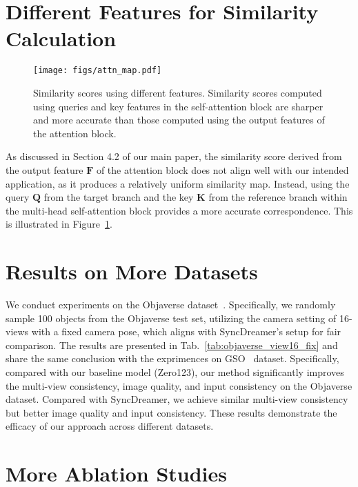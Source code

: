 \section{Different Features for Similarity Calculation}
\begin{figure}[t]
    \centering
    \texttt{[image: figs/attn\_map.pdf]}
    \caption{Similarity scores using different features. Similarity scores computed using queries and key features in the self-attention block are sharper and more accurate than those computed using the output features of the attention block.}
    \label{fig:attn_map}
\end{figure}

As discussed in Section 4.2 of our main paper, the similarity score derived from the output feature $\boldsymbol{F}$ of the attention block does not align well with our intended application, as it produces a relatively uniform similarity map. Instead, using the query $\boldsymbol{Q}$ from the target branch and the key $\boldsymbol{K}$ from the reference branch within the multi-head self-attention block provides a more accurate correspondence. This is illustrated in Figure~\ref{fig:attn_map}.

\section{Results on More Datasets}

We conduct experiments on the Objaverse dataset~\cite{objaverse}. Specifically, we randomly sample 100 objects from the Objaverse test set, utilizing the camera setting of 16-views with a fixed camera pose, which aligns with SyncDreamer's setup for fair comparison.
The results are presented in Tab.~\ref{tab:objaverse_view16_fix} and share the same conclusion with the exprimences on GSO~\cite{GSO} dataset.
Specifically, compared with our baseline model (Zero123), our method significantly improves the multi-view consistency, image quality, and input consistency on the Objaverse dataset. Compared with SyncDreamer, we achieve similar multi-view consistency but better image quality and input consistency. These results demonstrate the efficacy of our approach across different datasets.


\section{More Ablation Studies}



